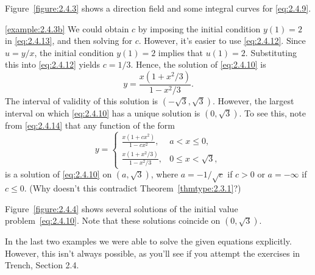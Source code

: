 \documentclass{ximera}
\begin{document}
\begin{example}
\begin{explanation}
Figure~\ref{figure:2.4.3} shows a direction field and some integral curves
for \eqref{eq:2.4.9}.



\ref{example:2.4.3b}  We could obtain $c$ by imposing
the initial condition $y(1)=2$ in \eqref{eq:2.4.13}, and then solving for
$c$. However, it's easier to use \eqref{eq:2.4.12}. Since $u=y/x$, the
initial
condition
$y(1)=2$ implies that $u(1)=2$.  Substituting this into \eqref{eq:2.4.12}
yields $c=1/3$.  Hence, the solution of \eqref{eq:2.4.10} is
$$
y=\frac{x(1+x^2/3)}{1-x^2/3}.
$$
The interval of validity of this solution is $(-\sqrt{3},\sqrt{3})$.
However, the largest interval on which \eqref{eq:2.4.10} has a unique
solution is $(0,\sqrt{3})$. To see this, note from \eqref{eq:2.4.14}
that any function of the form
\begin{equation} \label{eq:2.4.15}
y=\left\{\begin{array}{ll} \frac{x(1+cx^2)}{1-cx^2},&a<x\leq 0,\\
\frac{x(1+x^2/3)}{1-x^2/3},&0\leq x<\sqrt{3},
\end{array}\right.
\end{equation}
is a solution of \eqref{eq:2.4.10} on $(a,\sqrt{3})$, where $a=-1/\sqrt c$
if $c>0$ or $a=-\infty$ if $c\leq 0$. (Why doesn't this contradict
Theorem~\ref{thmtype:2.3.1}?)


 Figure~\ref{figure:2.4.4} shows several solutions of the
initial value problem~\eqref{eq:2.4.10}. Note that these solutions coincide
on $(0,\sqrt{3})$.
\end{explanation}
\end{example}

In the last two examples we were able to solve the given equations
explicitly.   However, this isn't  always possible, as you'll
see if you attempt the exercises in Trench, Section 2.4.
\end{document}
